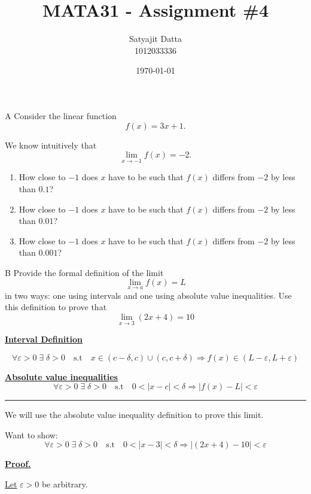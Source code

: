 \documentclass[]{article}
\title{\textbf{MATA31 - Assignment \#4}}
\author{ Satyajit Datta \\ 1012033336}
\date{\today}
\begin{document}
\maketitle

\begin{question}{A}
Consider the linear function
\[
f(x) = 3x + 1.
\]

We know intuitively that
\[
\lim_{x \to -1} f(x) = -2.
\]

\begin{enumerate}[label=\textbf{\Alph*.}]
    \item How close to $-1$ does $x$ have to be such that $f(x)$ differs from $-2$
    by less than $0.1$?
    \item How close to $-1$ does $x$ have to be such that $f(x)$ differs from $-2$
    by less than $0.01$?
    \item How close to $-1$ does $x$ have to be such that $f(x)$ differs from $-2$
    by less than $0.001$?
\end{enumerate}
\end{question}

\begin{question}{B}
    Provide the formal definition of the limit
    \[
    \lim_{x \to a} f(x) = L
    \]
    in two ways: one using intervals and one using absolute value inequalities. Use this definition to prove that
    \[
    \lim_{x \to 3} (2x+4) = 10
    \]
\end{question}

\underline{\bf{Interval Definition}}

\[
    \forall \varepsilon > 0 \;\exists\;\delta > 0 \quad \text{s.t} \quad x \in(c - \delta, c)\cup(c, c+\delta)\Longrightarrow f(x) \in (L-\varepsilon, L+\varepsilon)
\]

\underline{\bf{Absolute value inequalities}}
\[
    \forall \varepsilon > 0\;\exists\; \delta>0 \quad \text{s.t} \quad 
    0 < |x-c| < \delta \Longrightarrow |f(x) - L|  < \varepsilon
\]

\hrule
\vspace{0.1in}
We will use the absolute value inequality definition to prove this limit.

Want to show: 
\[
    \forall \varepsilon > 0\;\exists\; \delta>0 \quad \text{s.t} \quad 
    0 < |x-3| < \delta \Longrightarrow |(2x +4) - 10|  < \varepsilon
\]

\underline{\bf{Proof.}}

\underline{Let} $\varepsilon > 0$ be arbitrary.

\medbreak
\end{document}
